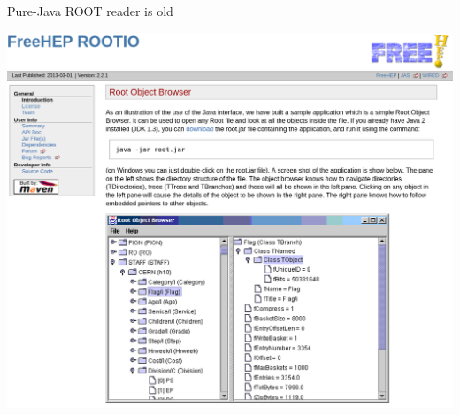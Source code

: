 \documentclass{beamer}
\begin{document}
\begin{frame}{Pure-Java ROOT reader is old}
\vspace{0.25 cm}
\begin{center}
\includegraphics[width=0.9\linewidth]{rootio-screenshot.png}
\end{center}
\end{frame}
\end{document}
